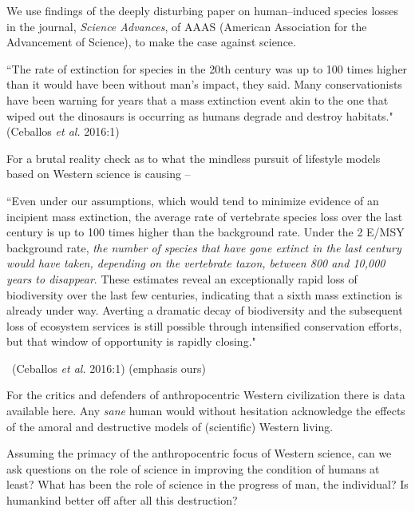 We use findings of the deeply disturbing paper on human–induced species losses in the journal, \textit{Science Advances}, of AAAS (American Association for the Advancement of Science), to make the case against science.

\begin{myquote}
“The rate of extinction for species in the 20th century was up to 100 times higher than it would have been without man’s impact, they said. Many conservationists have been warning for years that a mass extinction event akin to the one that wiped out the dinosaurs is occurring as humans degrade and destroy habitats." \hfill (Ceballos \textit{et al.} 2016:1)
\end{myquote}

For a brutal reality check as to what the mindless pursuit of lifestyle models based on Western science is causing –

\begin{myquote}
“Even under our assumptions, which would tend to minimize evidence of an incipient mass extinction, the average rate of vertebrate species loss over the last century is up to 100 times higher than the background rate. Under the 2 E/MSY background rate, \textit{the number of species that have gone extinct in the last century would have taken, depending on the vertebrate taxon, between 800 and 10,000 years to disappear}. These estimates reveal an exceptionally rapid loss of biodiversity over the last few centuries, indicating that a sixth mass extinction is already under way. Averting a dramatic decay of biodiversity and the subsequent loss of ecosystem services is still possible through intensified conservation efforts, but that window of opportunity is rapidly closing." 

~\hfill (Ceballos \textit{et al.} 2016:1) (emphasis ours)
\end{myquote}

For the critics and defenders of anthropocentric Western civilization there is data available here. Any \textit{sane} human would without hesitation acknowledge the effects of the amoral and destructive models of (scientific) Western living.

Assuming the primacy of the anthropocentric focus of Western science, can we ask questions on the role of science in improving the condition of humans at least? What has been the role of science in the progress of man, the individual? Is humankind better off after all this destruction?

